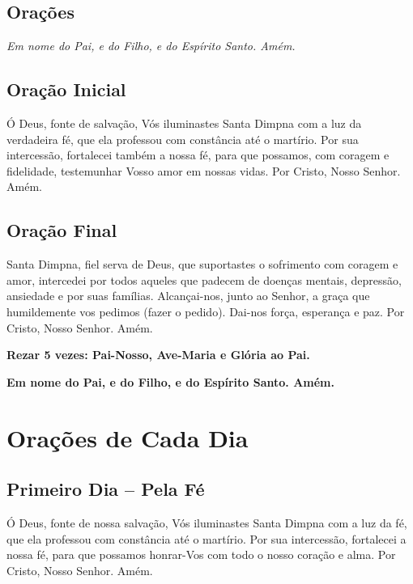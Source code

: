 \documentclass[18pt]{article}
\begin{document}
\newpage

\begin{justify}
\begin{center}
\section{Orações}\label{sec:Orações}
\textit{Em nome do Pai, e do Filho, e do Espírito Santo. Amém.}
\end{center}

\subsection*{Oração Inicial}
Ó Deus, fonte de salvação, Vós iluminastes Santa Dimpna com a luz da verdadeira fé, que ela professou com constância até o martírio. Por sua intercessão, fortalecei também a nossa fé, para que possamos, com coragem e fidelidade, testemunhar Vosso amor em nossas vidas. Por Cristo, Nosso Senhor. Amém.

\subsection*{Oração Final}
Santa Dimpna, fiel serva de Deus, que suportastes o sofrimento com coragem e amor, intercedei por todos aqueles que padecem de doenças mentais, depressão, ansiedade e por suas famílias. Alcançai-nos, junto ao Senhor, a graça que humildemente vos pedimos (fazer o pedido). Dai-nos força, esperança e paz. Por Cristo, Nosso Senhor. Amém.

\textbf{Rezar 5 vezes: Pai-Nosso, Ave-Maria e Glória ao Pai.}

\textbf{Em nome do Pai, e do Filho, e do Espírito Santo. Amém.}

\vfill
\end{justify}


\newpage

\section*{Orações de Cada Dia}

\subsection*{Primeiro Dia -- Pela Fé}
Ó Deus, fonte de nossa salvação, Vós iluminastes Santa Dimpna com a luz da fé, que ela professou com constância até o martírio. Por sua intercessão, fortalecei a nossa fé, para que possamos honrar-Vos com todo o nosso coração e alma. Por Cristo, Nosso Senhor. Amém.
\end{document}
